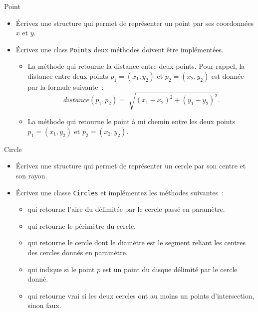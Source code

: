 \documentclass[a4paper,11pt]{article}
\begin{document}
	\begin{Exercice}{Point}
		\begin{itemize}
			\item
				Écrivez une structure qui permet de représenter un point par ses coordonnées $x$ et $y$.
			\item 
				Écrivez une class \texttt{Points} deux méthodes doivent être implémentées.
				\begin{itemize}
					\item 
						La méthode  qui retourne la distance entre deux points. Pour rappel, la distance entre deux points $p_1 = (x_1, y_2)$ et $p_2 = (x_2, y_2)$ est donnée par la formule suivante~:
						$$
							distance(p_1, p_2) = \sqrt[]{(x_1 - x_2)^2 + (y_1 - y_2)^2}.
						$$
					\item 
						La méthode  qui retourne le point à mi chemin entre les deux points $p_1 = (x_1, y_2)$ et $p_2 = (x_2, y_2)$.
				\end{itemize}
		\end{itemize}		
	\end{Exercice}

	\begin{Exercice}{Circle}
		\begin{itemize}
			\item
				Écrivez une structure qui permet de représenter un cercle par son centre et son rayon.
			\item
				Écrivez une classe \texttt{Circles} et implémentez les méthodes suivantes~:
				\begin{itemize}
					\item 
						 qui retourne l'aire du délimitée par le cercle passé en paramètre.
					\item
						 qui retourne le périmètre du cercle.
					\item  
						 qui retourne le cercle dont le diamètre est le segment reliant les centres des cercles donnés en paramètre.
					\item  
						 qui indique si le point $p$ est un point du disque délimité par le cercle donné.
					\item  
						 qui retourne vrai si les deux cercles ont au moins un points d'intersection, sinon faux.
				\end{itemize}
		\end{itemize}		
	\end{Exercice}
\end{document}
